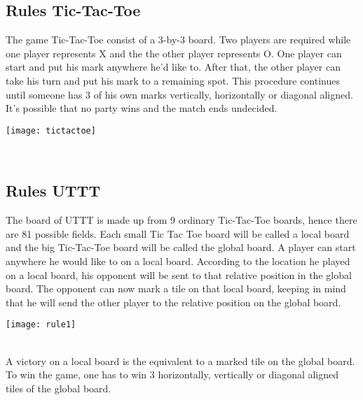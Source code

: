 \subsection {Rules Tic-Tac-Toe}

The game Tic-Tac-Toe consist of a 3-by-3 board. Two players are required while one player represents X and the the other player represents O. One player can start and put his mark anywhere he'd like to. After that, the other player can take his turn and put his mark to a remaining spot. This procedure continues until someone has 3 of his own marks vertically, horizontally or diagonal aligned. It's possible that no party wins and the match ends undecided.\\

\begin{fixedpic}
	\centering
	\texttt{[image: tictactoe]}
\end{fixedpic}\\



\subsection {Rules \ac{UTTT}} \label{rulesuttt}
The board of \ac{UTTT} is made up from 9 ordinary Tic-Tac-Toe boards, hence there are 81 possible fields.
Each small Tic Tac Toe board will be called a local board and the big Tic-Tac-Toe board will be called the global board.
A player can start anywhere he would like to on a local board. According to the location he played on a local board, his opponent will be sent to that relative position in the global board. The opponent can now mark a tile on that local board, keeping in mind that he will send the other player to the relative position on the global board. \\

\begin{fixedpic}
	\centering
	\texttt{[image: rule1]}
\end{fixedpic}\\

A victory on a local board is the equivalent to a marked tile on the global board. To win the game, one has to win 3 horizontally, vertically or diagonal aligned tiles of the global board.

